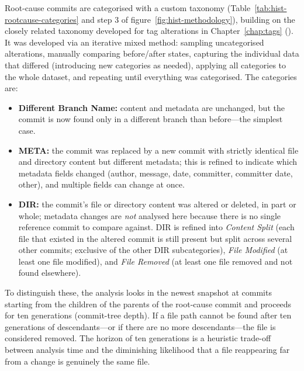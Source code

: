 Root-cause commits are categorised with a custom taxonomy (Table~\ref{tab:hist-rootcause-categories} and step 3 of figure~\ref{fig:hist-methodology}), building on the closely related taxonomy developed for tag alterations in Chapter~\ref{chap:tags} ().
It was developed via an iterative mixed method: sampling uncategorised alterations, manually comparing before/after states, capturing the individual data that differed (introducing new categories as needed), applying all categories to the whole dataset, and repeating until everything was categorised.
The categories are:
\begin{itemize}
\item \textbf{Different Branch Name:} content and metadata are unchanged, but the commit is now found only in a different branch than before---the simplest case.
\item \textbf{META:} the commit was replaced by a new commit with strictly identical file and directory content but different metadata; this is refined to indicate which metadata fields changed (author, message, date, committer, committer date, other), and multiple fields can change at once.
\item \textbf{DIR:} the commit's file or directory content was altered or deleted, in part or whole; metadata changes are \emph{not} analysed here because there is no single reference commit to compare against. DIR is refined into \emph{Content Split} (each file that existed in the altered commit is still present but split across several other commits; exclusive of the other DIR subcategories), \emph{File Modified} (at least one file modified), and \emph{File Removed} (at least one file removed and not found elsewhere).
\end{itemize}
To distinguish these, the analysis looks in the newest snapshot at commits starting from the children of the parents of the root-cause commit and proceeds for ten generations (commit-tree depth).
If a file path cannot be found after ten generations of descendants---or if there are no more descendants---the file is considered removed.
The horizon of ten generations is a heuristic trade-off between analysis time and the diminishing likelihood that a file reappearing far from a change is genuinely the same file.


